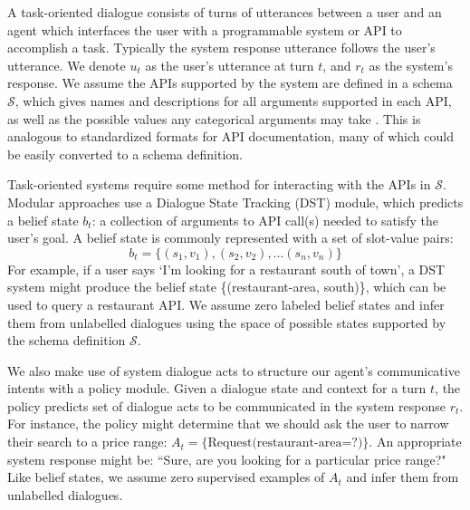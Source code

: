 \documentclass[11pt]{article}
\newcommand{\schema}[0]{\mathcal{S}}
\newcommand{\jmf}[1]{}
\begin{document}
A task-oriented dialogue consists of turns of utterances between a user and an agent which interfaces the user with a programmable system or API to accomplish a task. Typically the system response utterance follows the user's utterance.
We denote $u_t$ as the user's utterance at turn $t$, and $r_t$ as the system's response. 
We assume the APIs supported by the system are defined in a schema $\schema$, which gives names and descriptions for all arguments supported in each API, as well as the possible values any categorical arguments may take \cite{rastogi_towards_2020}. 
This is analogous to standardized formats for API documentation, many of which could be easily converted to a schema definition.

Task-oriented systems require some method for interacting with the APIs in $\schema$. 
Modular approaches use a Dialogue State Tracking (DST) module, which predicts a belief state $b_t$\jmf{should we call this API call(s) instead?}: a collection of arguments to API call(s) needed to satisfy the user's goal. 
A belief state is commonly represented with a set of slot-value pairs:
$$
b_t = \{(s_1, v_1), (s_2, v_2), ... (s_n, v_n)\}
$$
For example, if a user says `I'm looking for a restaurant south of town', a DST system might produce the belief state \{(restaurant-area, south)\}, which can be used to query a restaurant API. We assume zero labeled belief states and infer them from unlabelled dialogues using the space of possible states supported by the schema definition $\schema$.

We also make use of system dialogue acts to structure our agent's communicative intents with a policy module. 
Given a dialogue state and context for a turn $t$, the policy predicts set of dialogue acts to be communicated in the system response $r_t$. 
For instance, the policy might determine that we should ask the user to narrow their search to a price range: $A_t = \{\text{Request(restaurant-area=?)}\}$.
An appropriate system response might be: ``Sure, are you looking for a particular price range?"
Like belief states, we assume zero supervised examples of $A_t$ and infer them from unlabelled dialogues. 
\end{document}
